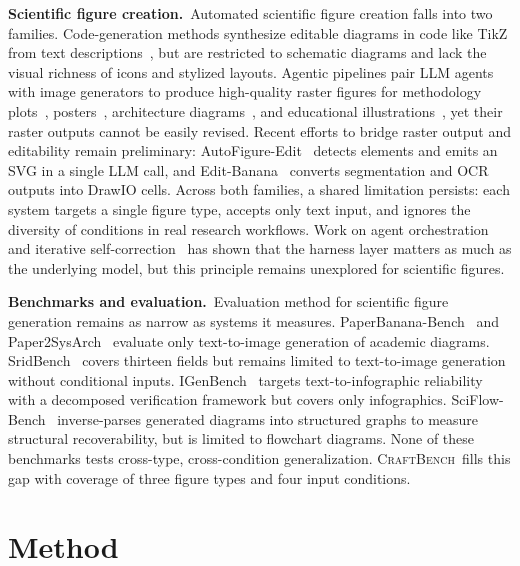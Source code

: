 \documentclass{llmxive}
\providecommand{\CrafterBench}{\textsc{CraftBench}\xspace}
\begin{document}
\noindent\textbf{Scientific figure creation.}\
Automated scientific figure creation falls into two families. Code-generation methods synthesize editable diagrams in code like TikZ from text descriptions~\citep{belouadi2024automatikz,zala2024diagrammergpt,greisinger2026tikzilla}, but are restricted to schematic diagrams and lack the visual richness of icons and stylized layouts. Agentic pipelines pair LLM agents with image generators to produce high-quality raster figures for methodology plots~\citep{zhu2026paperbanana,zhu2026autofigure}, posters~\citep{sun2025p2p}, architecture diagrams~\citep{guo2026paper2sysarch}, and educational illustrations~\citep{kukreja2026cage,yang2026omnidiagram}, yet their raster outputs cannot be easily revised. Recent efforts to bridge raster output and editability remain preliminary: AutoFigure-Edit~\citep{lin2026autofigureedit} detects elements and emits an SVG in a single LLM call, and Edit-Banana~\citep{editbanana2026} converts segmentation and OCR outputs into DrawIO cells. Across both families, a shared limitation persists: each system targets a single figure type, accepts only text input, and ignores the diversity of conditions in real research workflows. Work on agent orchestration~\citep{young2025harness,pan2026nlaharnesses} and iterative self-correction~\citep{madaan2023selfrefine} has shown that the harness layer matters as much as the underlying model, but this principle remains unexplored for scientific figures.

\noindent\textbf{Benchmarks and evaluation.}\
Evaluation method for scientific figure generation remains as narrow as systems it measures. PaperBanana-Bench~\citep{zhu2026paperbanana} and Paper2SysArch~\citep{guo2026paper2sysarch} evaluate only text-to-image generation of academic diagrams. SridBench~\citep{chang2025sridbenchbenchmarkscientificresearch} covers thirteen fields but remains limited to text-to-image generation without conditional inputs. IGenBench~\citep{tang2026igenbench} targets text-to-infographic reliability with a decomposed verification framework but covers only infographics. SciFlow-Bench~\citep{zhang2026sciflowbench} inverse-parses generated diagrams into structured graphs to measure structural recoverability, but is limited to flowchart diagrams. None of these benchmarks tests cross-type, cross-condition
generalization. \CrafterBench\ fills this gap with coverage of
three figure types and four input conditions.



\section{Method}
\label{sec:method}
\end{document}
